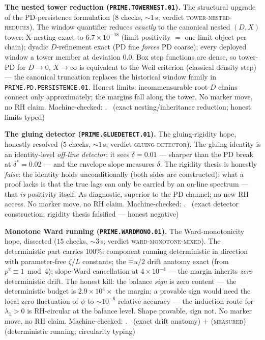 \documentclass[11pt,a4paper]{article}
\theoremstyle{definition}
\begin{document}
\par\smallskip\noindent\textbf{The nested tower reduction
(\texttt{PRIME.TOWERNEST.01}).}
The structural upgrade of the PD-persistence formulation ($8$
checks, ${\sim}1$\,s; verdict \textsc{tower-nested-reduces}).  The
window quantifier reduces \emph{exactly} to the canonical nested
$(D,X)$ tower: X-nesting exact to $6.7\times10^{-18}$ (limit
positivity $=$ one limit object per chain); dyadic $D$-refinement
exact (PD fine \emph{forces} PD coarse); every deployed window a
tower member at deviation $0.0$.  Box step functions are dense, so
tower-PD for $D\to0$, $X\to\infty$ is equivalent to the Weil
criterion (classical density step) --- the canonical truncation
replaces the historical window family in
\texttt{PRIME.PD.PERSISTENCE.01}.  Honest limits: incommensurable
root-$D$ chains connect only approximately; the margins fall along
the tower.  No marker move, no RH claim.
Machine-checked: .
\mE\ (exact nesting/inheritance reduction; honest limits typed)
\par\smallskip

\par\smallskip\noindent\textbf{The gluing detector
(\texttt{PRIME.GLUEDETECT.01}).}
The gluing-rigidity hope, honestly resolved ($5$ checks,
${\sim}1$\,s; verdict \textsc{gluing-detector}).  The gluing
identity is an identity-level \emph{off-line detector}: it sees
$\delta=0.01$ --- sharper than the PD break at $\delta^*=0.02$ ---
and the envelope slope measures $\delta$.  The rigidity thesis is
honestly \emph{false}: the identity holds unconditionally (both
sides are constructed); what a proof lacks is that the true lags
can only be carried by an on-line spectrum --- that \emph{is}
positivity itself.  As diagnostic, superior to the PD channel; no
new RH access.  No marker move, no RH claim.
Machine-checked: .
\mE\ (exact detector construction; rigidity thesis falsified ---
honest negative)
\par\smallskip

\par\smallskip\noindent\textbf{Monotone Ward running
(\texttt{PRIME.WARDMONO.01}).}
The Ward-monotonicity hope, dissected ($15$ checks, ${\sim}3$\,s;
verdict \textsc{ward-monotone-mixed}).  The deterministic part
carries $100\%$: component running deterministic in direction with
parameter-free $\zeta$/$L$ constants; the $\mp u/2$ drift anatomy
exact (from $p^2\equiv1\bmod4$); slope-Ward cancellation at
$4\times10^{-4}$ --- the margin inherits \emph{zero} deterministic
drift.  The honest kill: the balance \emph{sign} is zero content
--- the deterministic budget is $2.9\times10^4\times$ the margin;
a provable sign would need the local zero fluctuation of $\psi$ to
${\sim}10^{-6}$ relative accuracy --- the induction route for
$\lambda_1>0$ is RH-circular at the balance level.  Shape provable,
sign not.  No marker move, no RH claim.
Machine-checked: .
\mE\ (exact drift anatomy) $+$ (\textsc{measured}) (deterministic
running; circularity typing)
\par\smallskip
\end{document}

